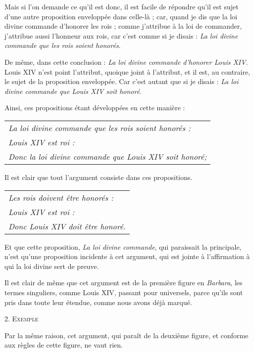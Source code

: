 Mais si l'on demande ce qu'il est donc, il est facile de répondre qu'il est sujet d'une autre proposition enveloppée dans celle-là ; car, quand je dis que la loi divine commande d'honorer les rois ; comme j'attribue à la loi de commander, j'attribue aussi l'honneur aux rois, car c'est comme si je disais : \emph{La loi divine commande que les rois soient honorés}.

De même, dans cette conclusion : \emph{La loi divine commande d'honorer Louis XIV}. Louis XIV n'est point l'attribut, quoique joint à l'attribut, et il est, au contraire, le sujet de la proposition enveloppée. Car c'est autant que si je disais : \emph{La loi divine commande que Louis XIV soit honoré}.

Ainsi, ces propositions étant développées en cette manière :

	\begin{tabularx}{\textwidth}{X}
		\emph{La loi divine commande que les rois soient honorés :}  \\
		\emph{Louis XIV est roi :}  \\
		\emph{Donc la loi divine commande que Louis XIV soit honoré;} \\
	\end{tabularx}

Il est clair que tout l'argument consiste dans ces propositions.

	\begin{tabularx}{\textwidth}{X}
		\emph{Les rois doivent être honorés :} \\
		\emph{Louis XIV est roi :} \\
		\emph{Donc Louis XIV doit être honoré.} \\
	\end{tabularx}

Et que cette proposition, \emph{La loi divine commande}, qui paraissait la principale, n'est qu'une proposition incidente à cet argument, qui est jointe à l'affirmation à qui la loi divine sert de preuve.

Il est clair de même que cet argument est de la première figure en \emph{Barbara}, les termes singuliers, comme Louis XIV, passant pour universels, parce qu'ils sont pris dans toute leur étendue, comme nous avons déjà marqué.

\begin{center}{\scshape 2. Exemple}\end{center}

Par la même raison, cet argument, qui paraît de la deuxième figure, et conforme aux règles de cette figure, ne vaut rien.

